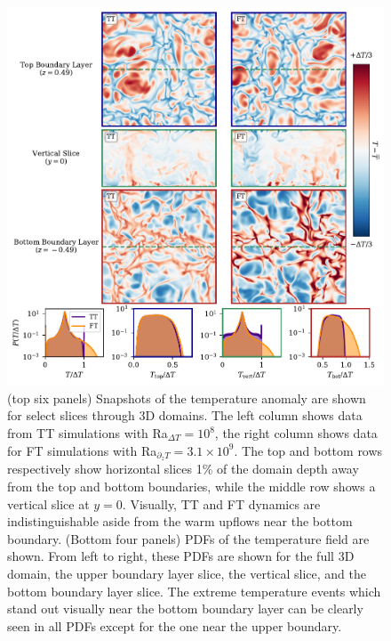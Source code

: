 \documentclass[aps, pre, onecolumn, nofootinbib, notitlepage, groupedaddress, amsfonts, amssymb, amsmath, longbibliography, superscriptaddress]{revtex4-1}
\begin{document}
\begin{figure}[p!]
\includegraphics[width=\textwidth]{./figs/rbc_3D_panels.pdf}
\caption{ 
	(top six panels) Snapshots of the temperature anomaly are shown for select slices through 3D domains.
	The left column shows data from TT simulations with Ra$_{\Delta T} = 10^{8}$, the right column shows data for FT simulations with Ra$_{\partial_z T} = 3.1 \times 10^{9}$.
	The top and bottom rows respectively show horizontal slices 1\% of the domain depth away from the top and bottom boundaries, while the middle row shows a vertical slice at $y = 0$.
	Visually, TT and FT dynamics are indistinguishable aside from the warm upflows near the bottom boundary.
	(Bottom four panels) PDFs of the temperature field are shown.
	From left to right, these PDFs are shown for the full 3D domain, the upper boundary layer slice, the vertical slice, and the bottom boundary layer slice.
	The extreme temperature events which stand out visually near the bottom boundary layer can be clearly seen in all PDFs except for the one near the upper boundary.
	\label{fig:rbc_3D_panels} }
\end{figure}
\end{document}
